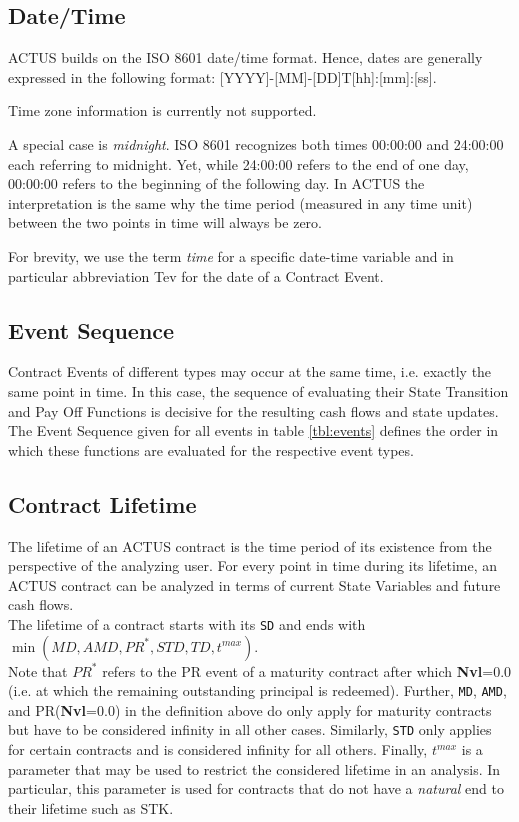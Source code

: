 \documentclass[9pt,oneside]{amsart}
\newcommand{\attr}[1]{\texttt{#1}}
\newcommand{\tmax}{t^{max}}
\begin{document}
\begin{multicols}{2}
\subsection{Date/Time}

ACTUS builds on the ISO 8601 date/time format. Hence, dates are generally expressed in the following format: [YYYY]-[MM]-[DD]T[hh]:[mm]:[ss].

Time zone information is currently not supported.

A special case is \textit{midnight}. ISO 8601 recognizes both times 00:00:00 and 24:00:00 each referring to midnight. Yet, while 24:00:00 refers to the end of one day, 00:00:00 refers to the beginning of the following day. In ACTUS the interpretation is the same why the time period (measured in any time unit) between the two points in time will always be zero. 

For brevity, we use the term \textit{time} for a specific date-time variable and in particular abbreviation Tev for the date of a Contract Event.


\subsection{Event Sequence}

Contract Events of different types may occur at the same time, i.e. exactly the same point in time. In this case, the sequence of evaluating their State Transition and Pay Off Functions is decisive for the resulting cash flows and state updates. The Event Sequence given for all events in table \ref{tbl:events} defines the order in which these functions are evaluated for the respective event types.


\subsection{Contract Lifetime}

The lifetime of an ACTUS contract is the time period of its existence from the perspective of the analyzing user. For every point in time during its lifetime, an ACTUS contract can be analyzed in terms of current State Variables and future cash flows.\\

The lifetime of a contract starts with its \attr{SD} and ends with $\min(MD, AMD, PR^*, STD, TD,\tmax)$.\\

Note that $PR^*$ refers to the PR event of a maturity contract after which \textbf{Nvl}=0.0 (i.e. at which the remaining outstanding principal is redeemed). Further, \attr{MD}, \attr{AMD}, and PR(\textbf{Nvl}=0.0) in the definition above do only apply for maturity contracts but have to be considered infinity in all other cases. Similarly, \attr{STD} only applies for certain contracts and is considered infinity for all others. Finally, $\tmax$ is a parameter that may be used to restrict the considered lifetime in an analysis. In particular, this parameter is used for contracts that do not have a \textit{natural} end to their lifetime such as STK.



\end{multicols}
\end{document}

